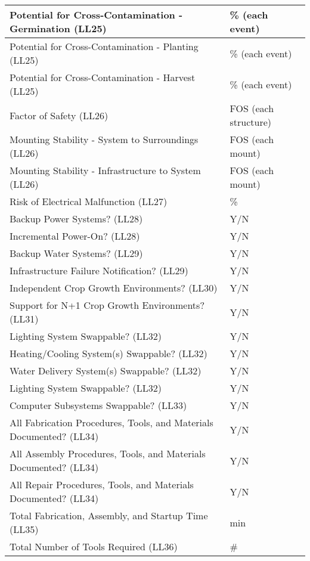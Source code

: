 \documentclass{report}
\newcounter{metricnumber}
\newcommand\rownumber{\stepcounter{metricnumber}\arabic{metricnumber}}
\begin{document}
\begin{center}
\begin{tabular}{| @{\makebox[2em][l]{\rownumber}} | l | l |}
        \hline
        Potential for Cross-Contamination - Germination \hfill (LL25) & \% (each event)\\
        \hline
        Potential for Cross-Contamination - Planting \hfill (LL25) & \% (each event)\\
        \hline
        Potential for Cross-Contamination - Harvest \hfill (LL25) & \% (each event)\\
        \hline
        Factor of Safety \hfill (LL26) & FOS (each structure)\\
        \hline
        Mounting Stability - System to Surroundings \hfill (LL26) & FOS (each mount) \\
        \hline
        Mounting Stability - Infrastructure to System \hfill (LL26) & FOS (each mount) \\
        \hline
        Risk of Electrical Malfunction \hfill (LL27) & \% \\
        \hline
        Backup Power Systems? \hfill (LL28) & Y/N \\
        \hline
        Incremental Power-On? \hfill (LL28) & Y/N \\
        \hline
        Backup Water Systems? \hfill (LL29) & Y/N \\
        \hline
        Infrastructure Failure Notification? \hfill (LL29) & Y/N \\
        \hline
        Independent Crop Growth Environments? \hfill (LL30) & Y/N \\
        \hline
        Support for N+1 Crop Growth Environments? \hfill (LL31) & Y/N \\
        \hline
        Lighting System Swappable? \hfill (LL32) & Y/N \\
        \hline
        Heating/Cooling System(s) Swappable? \hfill (LL32) & Y/N \\
        \hline
        Water Delivery System(s) Swappable? \hfill (LL32) & Y/N \\
        \hline
        Lighting System Swappable? \hfill (LL32) & Y/N \\
        \hline
        Computer Subsystems Swappable? \hfill (LL33) & Y/N \\
        \hline
        All Fabrication Procedures, Tools, and Materials Documented? \hfill (LL34) & Y/N \\
        \hline
        All Assembly Procedures, Tools, and Materials Documented? \hfill (LL34) & Y/N \\
        \hline
        All Repair Procedures, Tools, and Materials Documented? \hfill (LL34) & Y/N \\
        \hline
        Total Fabrication, Assembly, and Startup Time \hfill (LL35) & min \\
        \hline
        Total Number of Tools Required \hfill (LL36) & \# \\
        \hline
    \end{tabular}
\end{center}
\end{document}

